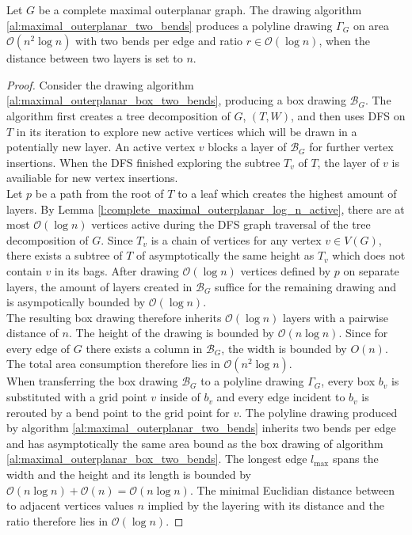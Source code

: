 \begin{theorem}
	Let $G$ be a complete maximal outerplanar graph. The drawing algorithm \ref{al:maximal_outerplanar_two_bends} produces a polyline drawing $\Gamma_{G}$ on area $\mathcal{O}(n^2 \log n)$ with two bends per edge and ratio $r \in \mathcal{O}(\log n)$, when the distance between two layers is set to $n$.\label{th:complete_maximal_outerplanar_ratio_logn}
\end{theorem}
\begin{proof}
	Consider the drawing algorithm \ref{al:maximal_outerplanar_box_two_bends}, producing a box drawing $\mathcal{B}_{G}$. The algorithm first creates a tree decomposition of $G$, $(T,W)$, and then uses DFS on $T$ in its iteration to explore new active vertices which will be drawn in a potentially new layer. An active vertex $v$ blocks a layer of $\mathcal{B}_{G}$ for further vertex insertions. When the DFS finished exploring the subtree $T_{v}$ of $T$, the layer of $v$ is availiable for new vertex insertions.\\
	Let $p$ be a path from the root of $T$ to a leaf which creates the highest amount of layers. By Lemma \ref{l:complete_maximal_outerplanar_log_n_active}, there are at most $\mathcal{O}(\log n)$ vertices active during the DFS graph traversal of the tree decomposition of $G$. Since $T_{v}$ is a chain of vertices for any vertex $v\in V(G)$, there exists a subtree of $T$ of asymptotically the same height as $T_{v}$ which does not contain $v$ in its bags. After drawing $\mathcal{O}(\log n)$ vertices defined by $p$ on separate layers, the amount of layers created in $\mathcal{B}_{G}$ suffice for the remaining drawing and is asympotically bounded by $\mathcal{O}(\log n)$.\\
	The resulting box drawing therefore inherits $\mathcal{O}(\log n)$ layers with a pairwise distance of $n$. The height of the drawing is bounded by $\mathcal{O}(n \log n)$. Since for every edge of $G$ there exists a column in $\mathcal{B}_{G}$, the width is bounded by $O(n)$. The total area consumption therefore lies in $\mathcal{O}(n^2 \log n)$.\\
	When transferring the box drawing $\mathcal{B}_{G}$ to a polyline drawing $\Gamma_{G}$, every box $b_v$ is substituted with a grid point $v$ inside of $b_v$ and every edge incident to $b_v$ is rerouted by a bend point to the grid point for $v$. The polyline drawing produced by algorithm \ref{al:maximal_outerplanar_two_bends} inherits two bends per edge and has asymptotically the same area bound as the box drawing of algorithm \ref{al:maximal_outerplanar_box_two_bends}. The longest edge $l_{\max}$ spans the width and the height and its length is bounded by $\mathcal{O}(n \log n) + \mathcal{O}(n) = \mathcal{O}(n \log n)$. The minimal Euclidian distance between to adjacent vertices values $n$ implied by the layering with its distance and the ratio therefore lies in $\mathcal{O}(\log n)$.
\end{proof}


